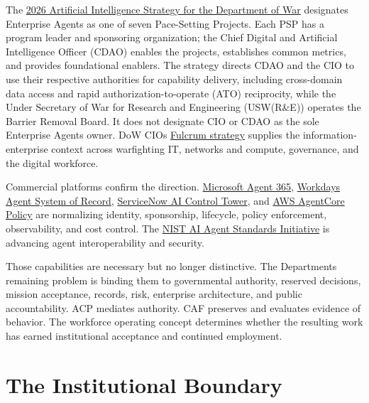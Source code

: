 \documentclass[11pt]{article}
\begin{document}
The
\href{https://media.defense.gov/2026/Jan/12/2003855671/-1/-1/0/ARTIFICIAL-INTELLIGENCE-STRATEGY-FOR-THE-DEPARTMENT-OF-WAR.PDF}{2026
Artificial Intelligence Strategy for the Department of War} designates
Enterprise Agents as one of seven Pace-Setting Projects. Each PSP has a
program leader and sponsoring organization; the Chief Digital and
Artificial Intelligence Officer (CDAO) enables the projects, establishes
common metrics, and provides foundational enablers. The strategy directs
CDAO and the CIO to use their respective authorities for capability
delivery, including cross-domain data access and rapid
authorization-to-operate (ATO) reciprocity, while the Under Secretary of
War for Research and Engineering (USW(R\&E)) operates the Barrier
Removal Board. It does not designate CIO or CDAO as the sole Enterprise
Agents owner. DoW CIO\textquotesingle s
\href{https://dodcio.defense.gov/Portals/0/Documents/Library/FulcrumAdvStrat.pdf}{Fulcrum
strategy} supplies the information-enterprise context across warfighting
IT, networks and compute, governance, and the digital workforce.

Commercial platforms confirm the direction.
\href{https://www.microsoft.com/en-us/microsoft-agent-365}{Microsoft
Agent 365},
\href{https://newsroom.workday.com/2025-02-11-The-Next-Generation-of-Workforce-Management-is-Here-Workday-Unveils-New-Agent-System-of-Record}{Workday\textquotesingle s
Agent System of Record},
\href{https://www.servicenow.com/products/ai-control-tower.html}{ServiceNow
AI Control Tower}, and
\href{https://docs.aws.amazon.com/bedrock-agentcore/latest/devguide/policy.html}{AWS
AgentCore Policy} are normalizing identity, sponsorship, lifecycle,
policy enforcement, observability, and cost control. The
\href{https://www.nist.gov/news-events/news/2026/02/announcing-ai-agent-standards-initiative-interoperable-and-secure}{NIST
AI Agent Standards Initiative} is advancing agent interoperability and
security.

Those capabilities are necessary but no longer distinctive. The
Department\textquotesingle s remaining problem is binding them to
governmental authority, reserved decisions, mission acceptance, records,
risk, enterprise architecture, and public accountability. ACP mediates
authority. CAF preserves and evaluates evidence of behavior. The
workforce operating concept determines whether the resulting work has
earned institutional acceptance and continued employment.

\hypertarget{2-the-institutional-boundary}{%
\section{The Institutional
Boundary}\label{2-the-institutional-boundary}}
\end{document}
